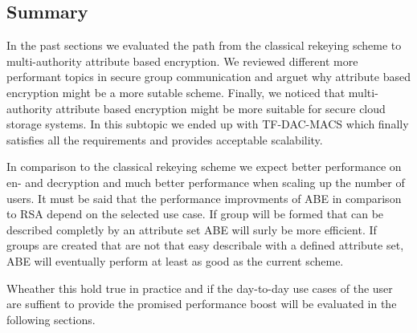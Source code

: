 \subsection{Summary}
In the past sections we evaluated the path from the classical rekeying scheme to multi-authority attribute based encryption. We reviewed different more performant topics in secure group communication and arguet why attribute based encryption might be a more sutable scheme. Finally, we noticed that multi-authority attribute based encryption might be more suitable for secure cloud storage systems. In this subtopic we ended up with TF-DAC-MACS which finally satisfies all the requirements and provides acceptable scalability. 

In comparison to the classical rekeying scheme we expect better performance on en- and decryption and much better performance when scaling up the number of users. It must be said that the performance improvments of ABE in comparison to RSA depend on the selected use case. If group will be formed that can be described completly by an attribute set ABE will surly be more efficient. If groups are created that are not that easy describale with a defined attribute set, ABE will eventually perform at least as good as the current scheme. 

Wheather this hold true in practice and if the day-to-day use cases of the user are suffient to provide the promised performance boost will be evaluated in the following sections.